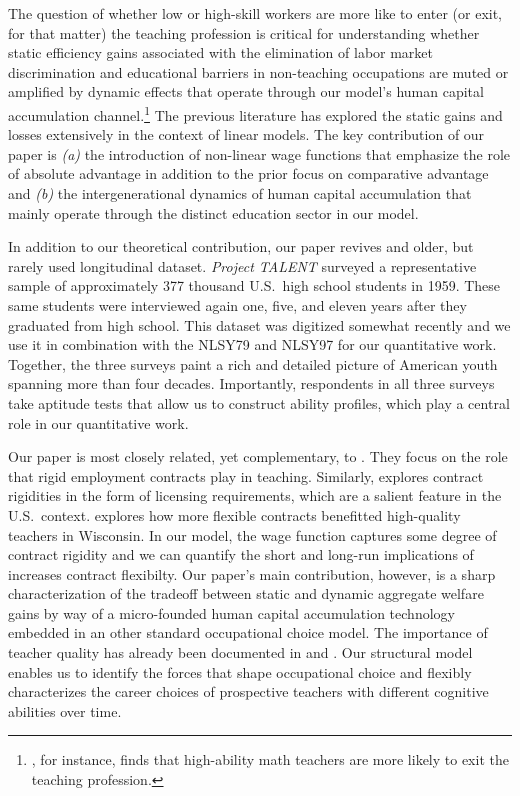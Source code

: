 \documentclass[onehalfspacing,11pt]{article}
\begin{document}
	The question of whether low or high-skill workers are more like to enter (or exit, for that matter) the teaching profession is critical for understanding whether static efficiency gains associated with the elimination of labor market discrimination and educational barriers in non-teaching occupations are muted or amplified by dynamic effects that operate through our model's human capital accumulation channel.\footnote{\cite{Wiswall:2013}, for instance, finds that high-ability math teachers are more likely to exit the teaching profession.} The previous literature has explored the static gains and losses extensively in the context of linear models. The key contribution of our paper is {\it (a)} the introduction of non-linear wage functions that emphasize the role of absolute advantage in addition to the prior focus on comparative advantage and {\it (b)} the intergenerational dynamics of human capital accumulation that mainly operate through the distinct education sector in our model.
	
	In addition to our theoretical contribution, our paper revives and older, but rarely used longitudinal dataset. {\it Project TALENT} surveyed a representative sample of approximately 377 thousand U.S.~high school students in 1959. These same students were interviewed again one, five, and eleven years after they graduated from high school. This dataset was digitized somewhat recently and we use it in combination with the NLSY79 and NLSY97 for our quantitative work. Together, the three surveys paint a rich and detailed picture of American youth spanning more than four decades. Importantly, respondents in all three surveys take aptitude tests that allow us to construct ability profiles, which play a central role in our quantitative work.
	
	Our paper is most closely related, yet complementary, to \cite{Kolm:2024}. They focus on the role that rigid employment contracts play in teaching. Similarly, \cite{Wiswall:2010} explores contract rigidities in the form of licensing requirements, which are a salient feature in the U.S.~context. \cite{Biasi:2021} explores how more flexible contracts benefitted high-quality teachers in Wisconsin. In our model, the wage function captures some degree of contract rigidity and we can quantify the short and long-run implications of increases contract flexibilty. Our paper's main contribution, however, is a sharp characterization of the tradeoff between static and dynamic aggregate welfare gains by way of a micro-founded human capital accumulation technology embedded in an other standard occupational choice model. The importance of teacher quality has already been documented in \cite{Chetty:2014a} and \cite{Chetty:2014b}. Our structural model enables us to identify the forces that shape occupational choice and flexibly characterizes the career choices of prospective teachers with different cognitive abilities over time.
	
\end{document}
